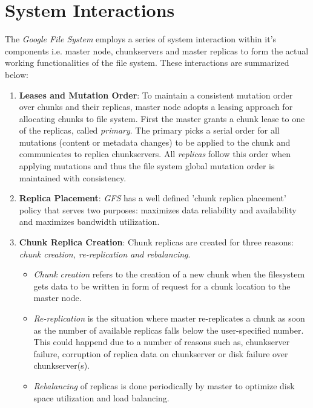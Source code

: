 \documentclass[12pt, a4paper]{article}
\begin{document}
\section*{System Interactions}
The \textit{Google File System}\cite{Ghemawat:2003:GFS:945445.945450} employs a series of system interaction within it's components i.e. master node, chunkservers and master replicas to form the actual working functionalities of the file system. These interactions are summarized below:
\begin{enumerate}
        \item \textbf{Leases and Mutation Order}: To maintain a consistent mutation order over chunks and their replicas, master node adopts a leasing approach for allocating chunks to file system. First the master grants a chunk lease to one of the replicas, called \textit{primary}. The primary picks a serial order for all mutations (content or metadata changes) to be applied to the chunk and communicates to replica chunkservers. All \textit{replicas} follow this order when applying mutations and thus the file system global mutation order is maintained with consistency.

        \item \textbf{Replica Placement}: \textit{GFS}\cite{Ghemawat:2003:GFS:945445.945450} has a well defined 'chunk replica placement' policy that serves two purposes: maximizes data reliability and availability and maximizes bandwidth utilization.

        \item \textbf{Chunk Replica Creation}: Chunk replicas are created for three reasons: \textit{chunk creation, re-replication and rebalancing}.
        \begin{itemize}
                \item \textit{Chunk creation} refers to the creation of a new chunk when the filesystem gets data to be written in form of request for a chunk location to the master node.

                \item \textit{Re-replication} is the situation where master re-replicates a chunk as soon as the number of available replicas falls below the user-specified number. This could happend due to a number of reasons such as, chunkserver failure, corruption of replica data on chunkserver or disk failure over chunkserver(s).

                \item \textit{Rebalancing} of replicas is done periodically by master to optimize disk space utilization and load balancing.
        \end{itemize}
        

\end{enumerate}
\end{document}
